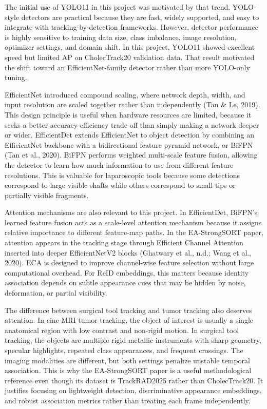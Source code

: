 \documentclass[12pt,a4paper]{article}
\begin{document}
The initial use of YOLO11 in this project was motivated by that trend. YOLO-style detectors are practical because they are fast, widely supported, and easy to integrate with tracking-by-detection frameworks. However, detector performance is highly sensitive to training data size, class imbalance, image resolution, optimizer settings, and domain shift. In this project, YOLO11 showed excellent speed but limited AP on CholecTrack20 validation data. That result motivated the shift toward an EfficientNet-family detector rather than more YOLO-only tuning.

EfficientNet introduced compound scaling, where network depth, width, and input resolution are scaled together rather than independently (Tan \& Le, 2019). This design principle is useful when hardware resources are limited, because it seeks a better accuracy-efficiency trade-off than simply making a network deeper or wider. EfficientDet extends EfficientNet to object detection by combining an EfficientNet backbone with a bidirectional feature pyramid network, or BiFPN (Tan et al., 2020). BiFPN performs weighted multi-scale feature fusion, allowing the detector to learn how much information to use from different feature resolutions. This is valuable for laparoscopic tools because some detections correspond to large visible shafts while others correspond to small tips or partially visible fragments.

Attention mechanisms are also relevant to this project. In EfficientDet, BiFPN's learned feature fusion acts as a scale-level attention mechanism because it assigns relative importance to different feature-map paths. In the EA-StrongSORT paper, attention appears in the tracking stage through Efficient Channel Attention inserted into deeper EfficientNetV2 blocks (Ghatwary et al., n.d.; Wang et al., 2020). ECA is designed to improve channel-wise feature selection without large computational overhead. For ReID embeddings, this matters because identity association depends on subtle appearance cues that may be hidden by noise, deformation, or partial visibility.

The difference between surgical tool tracking and tumor tracking also deserves attention. In cine-MRI tumor tracking, the object of interest is usually a single anatomical region with low contrast and non-rigid motion. In surgical tool tracking, the objects are multiple rigid metallic instruments with sharp geometry, specular highlights, repeated class appearances, and frequent crossings. The imaging modalities are different, but both settings penalize unstable temporal association. This is why the EA-StrongSORT paper is a useful methodological reference even though its dataset is TrackRAD2025 rather than CholecTrack20. It justifies focusing on lightweight detection, discriminative appearance embeddings, and robust association metrics rather than treating each frame independently.
\end{document}
